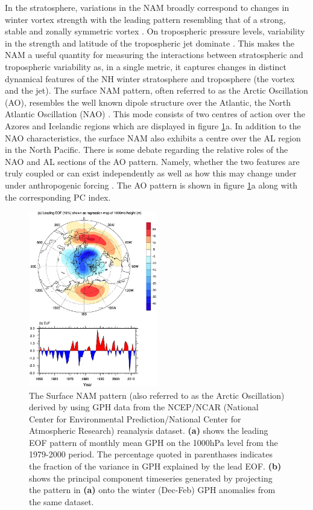 In the stratosphere, variations in the NAM broadly correspond to changes in winter vortex strength with the leading pattern resembling that of a strong, stable and zonally symmetric vortex \citep{baldwinPropagation1999}. On tropospheric pressure levels, variability in the strength and latitude of the tropospheric jet dominate \citep{limpasuvanEddies1999}. This makes the NAM a useful quantity for measuring the interactions between stratospheric and tropospheric variability as, in a single metric, it captures changes in distinct dynamical features of the NH winter stratosphere and troposphere (the vortex and the jet). The surface NAM pattern, often referred to as the Arctic Oscillation (AO), resembles the well known dipole structure over the Atlantic, the North Atlantic Oscillation (NAO) \citep{hurrellNorth2003c}. This mode consists of two centres of action over the Azores and Icelandic regions which are displayed in figure \ref{fig:AO}a. In addition to the NAO characteristics, the surface NAM also exhibits a centre over the AL region in the North Pacific. There is some debate regarding the relative roles of the NAO and AL sections of the AO pattern. Namely, whether the two features are truly coupled or can exist independently \citep{deserTeleconnectivity2000, ambaumArctic2001} as well as how this may change under under anthropogenic forcing \citep{hamoudaDecoupling2021}. The AO pattern is shown in figure \ref{fig:AO}a along with the corresponding PC index.

\begin{figure}[h!]
\centering
    \includegraphics[width=0.5\textwidth]{Figures/Figures-background/AO_pattern.jpg}
    \caption[Arctic Oscillation surface pattern and associted time series from the NCEP/NCAR reanalysis]{The Surface NAM pattern (also referred to as the Arctic Oscillation) derived by \cite{hegyiDynamical2011b} using GPH data from the NCEP/NCAR (National Center for Environmental Prediction/National Center for Atmospheric Research) reanalysis dataset. \textbf{(a)} shows the leading EOF pattern of monthly mean GPH on the 1000hPa level from the 1979-2000 period. The percentage quoted in parenthases indicates the fraction of the variance in GPH explained by the lead EOF. \textbf{(b)} shows the principal component timeseries generated by projecting the pattern in \textbf{(a)} onto the winter (Dec-Feb) GPH anomalies from the same dataset.}
\centering
\label{fig:AO}
\end{figure}


